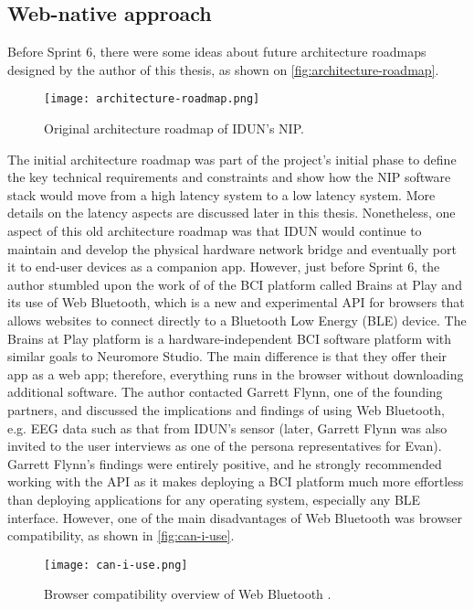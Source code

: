 \subsection{Web-native approach}
\label{chapter4-web-first-approach}

Before Sprint 6, there were some ideas about future architecture roadmaps designed by the author of this thesis, as shown on \autoref{fig:architecture-roadmap}.

\begin{figure}[!ht]
  \centering
  \texttt{[image: architecture-roadmap.png]}
  \caption{Original architecture roadmap of IDUN's NIP.}
  \label{fig:architecture-roadmap}
\end{figure}

The initial architecture roadmap was part of the project's initial phase to define the key technical requirements and constraints and show how the NIP software stack would move from a high latency system to a low latency system. More details on the latency aspects are discussed later in this thesis. Nonetheless, one aspect of this old architecture roadmap was that IDUN would continue to maintain and develop the physical hardware network bridge and eventually port it to end-user devices as a companion app. However, just before Sprint 6, the author stumbled upon the work of \citeauthor{flynn_brainsplay_nodate} of the BCI platform called Brains at Play and its use of Web Bluetooth, which is a new and experimental API for browsers that allows websites to connect directly to a Bluetooth Low Energy (BLE) device. The Brains at Play platform is a hardware-independent BCI software platform with similar goals to Neuromore Studio. The main difference is that they offer their app as a web app; therefore, everything runs in the browser without downloading additional software. The author contacted Garrett Flynn, one of the founding partners, and discussed the implications and findings of using Web Bluetooth, e.g. EEG data such as that from IDUN's sensor (later, Garrett Flynn was also invited to the user interviews as one of the persona representatives for Evan). Garrett Flynn's findings were entirely positive, and he strongly recommended working with the API as it makes deploying a BCI platform much more effortless than deploying applications for any operating system, especially any BLE interface. However, one of the main disadvantages of Web Bluetooth was browser compatibility, as shown in \autoref{fig:can-i-use}.

\begin{figure}[!ht]
  \centering
  \texttt{[image: can-i-use.png]}
  \caption{Browser compatibility overview of Web Bluetooth \citep{caniuse_web_nodate}.}
  \label{fig:can-i-use}
\end{figure}

